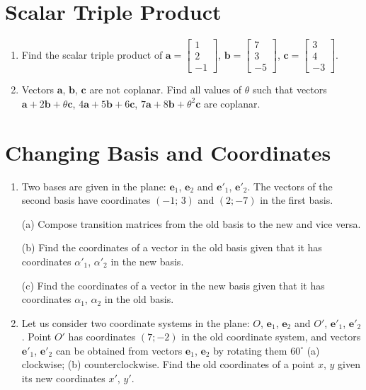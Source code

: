 \documentclass[a4paper,10pt]{article}
\begin{document}
\section{Scalar Triple Product}
\begin{enumerate}
\item
Find the scalar triple product of $\textbf{a}=\begin{bmatrix} 1 \\ 2 \\ -1  \end{bmatrix}$, $\textbf{b}=\begin{bmatrix} 7 \\ 3 \\ -5  \end{bmatrix}$, $\textbf{c}=\begin{bmatrix} 3 \\ 4 \\ -3  \end{bmatrix}$.

\item
Vectors $\textbf{a}$, $\textbf{b}$, $\textbf{c}$ are not coplanar. Find all values of $\theta$ such that vectors $\textbf{a}+2\textbf{b}+\theta\textbf{c}$, $4\textbf{a}+5\textbf{b}+6\textbf{c}$, $7\textbf{a}+8\textbf{b}+\theta^2\textbf{c}$ are coplanar.

\end{enumerate}

\section {Changing Basis and Coordinates}
\begin{enumerate}
\item
Two bases are given in the plane: $\textbf{e}_1$, $\textbf{e}_2$ and $\textbf{e}'_1$, $\textbf{e}'_2$. The vectors of the second basis have coordinates $(-1;\,3)$ and $(2;-7)$ in the first basis.

(a) Compose transition matrices from the old basis to the new and vice versa.

(b) Find the coordinates of a vector in the old basis given that it has coordinates $\alpha'_1$, $\alpha'_2$ in the new basis.

(c) Find the coordinates of a vector in the new basis given that it has coordinates $\alpha_1$, $\alpha_2$ in the old basis.

\item
Let us consider two coordinate systems in the plane: $O$, $\textbf{e}_1$, $\textbf{e}_2$ and $O'$, $\textbf{e}'_1$, $\textbf{e}'_2$. Point $O'$ has coordinates $(7;-2)$ in the old coordinate system, and vectors $\textbf{e}'_1$, $\textbf{e}'_2$ can be obtained from vectors $\textbf{e}_1$, $\textbf{e}_2$ by rotating them $60^{\circ}$ (a) clockwise; (b) counterclockwise. Find the old coordinates of a point $x$, $y$ given its new coordinates $x'$, $y'$.

\end{enumerate}
\end{document}

